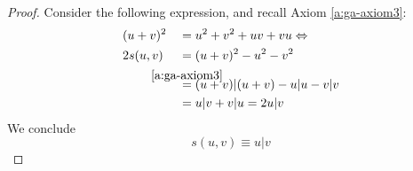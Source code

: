 \begin{proof}
	Consider the following expression, and recall Axiom \ref{a:ga-axiom3}:
	\begin{alignat*}{2}
		&(u+v)^2 &&= u^2 + v^2 + uv + vu \Leftrightarrow \\
		&2s(u,v) &&= (u+v)^2 - u^2 - v^2 \\
		& \ &&\overset{\mathclap{\ref{a:ga-axiom3}}}= (u+v)|(u+v) - u|u - v|v \\
		& \ &&= u|v + v|u = 2u|v 
    \end{alignat*}
	We conclude
	\[s(u,v) \equiv u|v\]
	
\end{proof}
